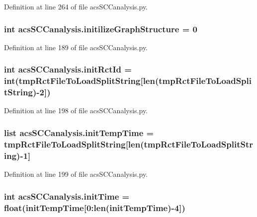 Definition at line 264 of file acs\-S\-C\-Canalysis.\-py.

\hypertarget{a00102_ac6ad18bfc83e8ea3254897d46f990855}{
\subsubsection[{initilize\-Graph\-Structure}]{\setlength{\rightskip}{0pt plus 5cm}int acs\-S\-C\-Canalysis.\-initilize\-Graph\-Structure = 0}}\label{a00102_ac6ad18bfc83e8ea3254897d46f990855}


Definition at line 189 of file acs\-S\-C\-Canalysis.\-py.

\hypertarget{a00102_a212643643fc6b002e8797f16633bb16d}{
\subsubsection[{init\-Rct\-Id}]{\setlength{\rightskip}{0pt plus 5cm}int acs\-S\-C\-Canalysis.\-init\-Rct\-Id = int({\bf tmp\-Rct\-File\-To\-Load\-Split\-String}\mbox{[}len({\bf tmp\-Rct\-File\-To\-Load\-Split\-String})-\/2\mbox{]})}}\label{a00102_a212643643fc6b002e8797f16633bb16d}


Definition at line 198 of file acs\-S\-C\-Canalysis.\-py.

\hypertarget{a00102_adc4403c4cfe080918c8b9da692c50509}{
\subsubsection[{init\-Temp\-Time}]{\setlength{\rightskip}{0pt plus 5cm}list acs\-S\-C\-Canalysis.\-init\-Temp\-Time = {\bf tmp\-Rct\-File\-To\-Load\-Split\-String}\mbox{[}len({\bf tmp\-Rct\-File\-To\-Load\-Split\-String})-\/1\mbox{]}}}\label{a00102_adc4403c4cfe080918c8b9da692c50509}


Definition at line 199 of file acs\-S\-C\-Canalysis.\-py.

\hypertarget{a00102_a826c1b0585b4e8474c76f92bd7583836}{
\subsubsection[{init\-Time}]{\setlength{\rightskip}{0pt plus 5cm}int acs\-S\-C\-Canalysis.\-init\-Time = float({\bf init\-Temp\-Time}\mbox{[}0\-:len({\bf init\-Temp\-Time})-\/4\mbox{]})}}\label{a00102_a826c1b0585b4e8474c76f92bd7583836}


